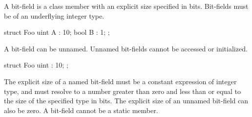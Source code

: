 \p A bit-field is a class member with an explicit size specified in bits. Bit-fields must be of an underflying integer type.
\begin{HLSL}
struct Foo {
  uint A : 10;
  bool B : 1;
};
\end{HLSL}
\p A bit-field can be unnamed.  Unnamed bit-fields cannot be accessed or initialized.
\begin{HLSL}
struct Foo {
  uint : 10;
};
\end{HLSL}
\p The explicit size of a named bit-field must be a constant expression of integer type, and must resolve to a number greater than zero and less than or equal to the size of the specified type in bits.
\p The explicit size of an unnamed bit-field can also be zero.
\p A bit-field cannot be a static member.
